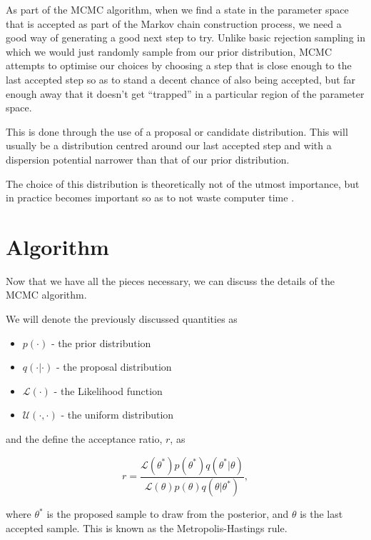     As part of the MCMC algorithm, when we find a state in the parameter space that is accepted as part of the Markov chain construction process, we need a good way of generating a good next step to try. Unlike basic rejection sampling in which we would just randomly sample from our prior distribution, MCMC attempts to optimise our choices by choosing a step that is close enough to the last accepted step so as to stand a decent chance of also being accepted, but far enough away that it doesn't get ``trapped'' in a particular region of the parameter space.

    This is done through the use of a proposal or candidate distribution. This will usually be a distribution centred around our last accepted step and with a dispersion potential narrower than that of our prior distribution.

    The choice of this distribution is theoretically not of the utmost importance, but in practice becomes important so as to not waste computer time \cite{Andrieu2003}.


\section{Algorithm}

    Now that we have all the pieces necessary, we can discuss the details of the MCMC algorithm.

    We will denote the previously discussed quantities as

    \begin{itemize}
        \item $p(\cdot)$ - the prior distribution
        \item $q(\cdot|\cdot)$ - the proposal distribution
        \item $\mathcal{L}(\cdot)$ - the Likelihood function
        \item $\mathcal{U}(\cdot,\cdot)$ - the uniform distribution
    \end{itemize}

    and the define the acceptance ratio, $r$, as

    \begin{equation}
    	r = \frac{\mathcal{L}(\theta^*)p(\theta^*)q(\theta^*|\theta)}{\mathcal{L}(\theta)p(\theta)q(\theta|\theta^*)},
    \end{equation}

    where $\theta^*$ is the proposed sample to draw from the posterior, and $\theta$ is the last accepted sample. This is known as the Metropolis-Hastings rule.

